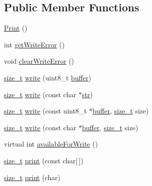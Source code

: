\subsection*{Public Member Functions}
\begin{DoxyCompactItemize}
\item 
\hyperlink{classPrint_a1b9fe938883bb7b4bce8fba012dab112}{Print} ()
\item 
int \hyperlink{classPrint_a88a4a829fb5d589efb43955ad0cbddcc}{get\-Write\-Error} ()
\item 
void \hyperlink{classPrint_aec9ecf84cc6d9087a650def3cefc459e}{clear\-Write\-Error} ()
\item 
\hyperlink{stddef_8h_aa9d55e2f20e580b7445617d0d12fff6e}{size\-\_\-t} \hyperlink{classPrint_a430f951caa5532507128f6a24beedffd}{write} (uint8\-\_\-t \hyperlink{ThroughSerial_2RemoteWorker_2DeviceGeneric_2DeviceGeneric_8cpp_ad1a11643f6815853e0558861103c9a60}{buffer})
\item 
\hyperlink{stddef_8h_aa9d55e2f20e580b7445617d0d12fff6e}{size\-\_\-t} \hyperlink{classPrint_a5b40e0e9cab1f2fe5bb0cb22ffe5adda}{write} (const char $\ast$\hyperlink{General__Stuff_8h_ad8ab729381f270b100f3d05b6c6676fc}{str})
\item 
\hyperlink{stddef_8h_aa9d55e2f20e580b7445617d0d12fff6e}{size\-\_\-t} \hyperlink{classPrint_ad98d820df11e2697be1e4b1ea30b4a23}{write} (const uint8\-\_\-t $\ast$\hyperlink{ThroughSerial_2RemoteWorker_2DeviceGeneric_2DeviceGeneric_8cpp_ad1a11643f6815853e0558861103c9a60}{buffer}, \hyperlink{stddef_8h_aa9d55e2f20e580b7445617d0d12fff6e}{size\-\_\-t} size)
\item 
\hyperlink{stddef_8h_aa9d55e2f20e580b7445617d0d12fff6e}{size\-\_\-t} \hyperlink{classPrint_abfdd93a61c4b95a3ba41680188505e73}{write} (const char $\ast$\hyperlink{ThroughSerial_2RemoteWorker_2DeviceGeneric_2DeviceGeneric_8cpp_ad1a11643f6815853e0558861103c9a60}{buffer}, \hyperlink{stddef_8h_aa9d55e2f20e580b7445617d0d12fff6e}{size\-\_\-t} size)
\item 
virtual int \hyperlink{classPrint_ae278602698f895c25820f18da4e765be}{available\-For\-Write} ()
\item 
\hyperlink{stddef_8h_aa9d55e2f20e580b7445617d0d12fff6e}{size\-\_\-t} \hyperlink{classPrint_acfe80773011eb17dfb52c2fba517a093}{print} (const char\mbox{[}$\,$\mbox{]})
\item 
\hyperlink{stddef_8h_aa9d55e2f20e580b7445617d0d12fff6e}{size\-\_\-t} \hyperlink{classPrint_a1e411d07a8ffec5faf7ce485bac0f029}{print} (char)
\item 

\end{DoxyCompactItemize}

